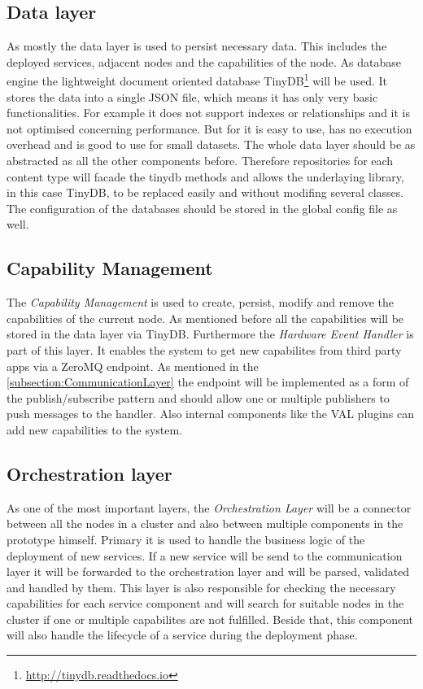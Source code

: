 \subsection{Data layer}
As mostly the data layer is used to persist necessary data.
This includes the deployed services, adjacent nodes and the capabilities of the node.
As database engine the lightweight document oriented database TinyDB\footnote{\url{http://tinydb.readthedocs.io}} will be used.
It stores the data into a single \ac{JSON} file, which means it has only very basic functionalities.
For example it does not support indexes or relationships and it is not optimised concerning performance.
But for it is easy to use, has no execution overhead and is good to use for small datasets.
The whole data layer should be as abstracted as all the other components before.
Therefore repositories for each content type will facade the tinydb methods and allows the underlaying library, in this case TinyDB, to be replaced easily and
without modifing several classes.
The configuration of the databases should be stored in the global config file as well.

\subsection{Capability Management}
The \textit{Capability Management} is used to create, persist, modify and remove the capabilities of the current node.
As mentioned before all the capabilities will be stored in the data layer via TinyDB.
Furthermore the \textit{Hardware Event Handler} is part of this layer.
It enables the system to get new capabilites from third party apps via a ZeroMQ endpoint.
As mentioned in the \ref{subsection:CommunicationLayer} the endpoint will be implemented as a form of the publish/subscribe pattern and should allow one or multiple publishers to push messages to the handler.
Also internal components like the \ac{VAL} plugins can add new capabilities to the system.

\subsection{Orchestration layer}
As one of the most important layers, the \textit{Orchestration Layer} will be a connector between all the nodes in a cluster and also between multiple components in the prototype himself.
Primary it is used to handle the business logic of the deployment of new services.
If a new service will be send to the communication layer it will be forwarded to the orchestration layer and will be parsed, validated and handled by them.
This layer is also responsible for checking the necessary capabilities for each service component and will search for suitable nodes in the cluster if one or multiple capabilites are not fulfilled.
Beside that, this component will also handle the lifecycle of a service during the deployment phase.

